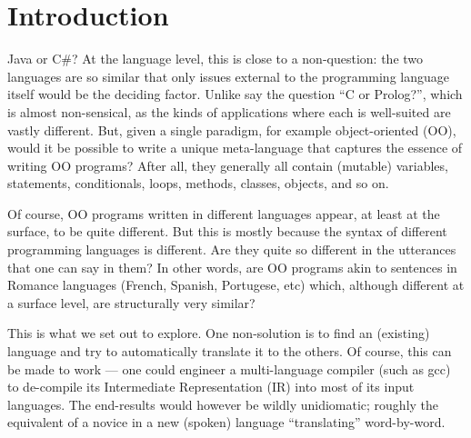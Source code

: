 \documentclass[sigplan,review,anonymous,prologue,dvipsnames]{acmart}
\newcommand{\Csharp}{C\#}
\begin{document}




\maketitle


\section{Introduction}

Java or \Csharp? At the language level, this is close to a 
non-question: the two languages are so similar that only issues
external to the programming language itself would be the 
deciding factor.  Unlike say the question ``C or Prolog?'', which
is almost non-sensical, as the kinds of applications where each
is well-suited are vastly different.  But, given a single
paradigm, for example object-oriented (OO), would it be possible to
write a unique meta-language that captures the essence of writing
OO programs?  After all, they generally all contain (mutable)
variables, statements, conditionals, loops, methods, classes, objects,
and so on.

Of course, OO programs written in different languages appear, at
least at the surface, to be quite different. But this is mostly because
the syntax of different programming languages is different. Are they
quite so different in the utterances that one can say in them? In other
words, are OO programs akin to sentences in Romance languages
(French, Spanish, Portugese, etc) which, although different at a
surface level, are structurally very similar?

This is what we set out to explore.  One non-solution is to find an
(existing) language and try to automatically translate it to the others.
Of course, this can be made to work --- one could
engineer a multi-language compiler (such as gcc) to de-compile its Intermediate 
Representation (IR) into most of its input languages.  The end-results would 
however
be wildly unidiomatic; roughly the equivalent of a novice
in a new (spoken) language ``translating'' word-by-word.
\end{document}
